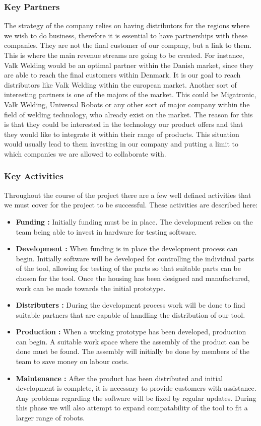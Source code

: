 \subsubsection{Key Partners}
The strategy of the company relies on having distributors for the regions where we wish to do business, therefore it is essential to have partnerships with these companies. They are not the final customer of our company, but a link to them. This is where the main revenue streams are going to be created.
For instance, Valk Welding would be an optimal partner within the Danish market, since they are able to reach the final customers within Denmark. It is our goal to reach distributors like Valk Welding within the european market.
Another sort of interesting partners is one of the majors of the market. This could be Migatronic, Valk Welding, Universal Robots or any other sort of major company within the field of welding technology, who already exist on the market. The reason for this is that they could be interested in the technology our product offers and that they would like to integrate it within their range of products. This situation would usually lead to them investing in our company and putting a limit to which companies we are allowed to collaborate with.

\subsubsection{Key Activities}
Throughout the course of the project there are a few well defined activities that we must cover for the project to be successful. These activities are described here:

\begin{itemize}
	\item \textbf{Funding		:} Initially funding must be in place. The development relies on the team being able to invest in hardware for testing software. 
	\item \textbf{Development	:} When funding is in place the development process can begin. Initially software will be developed for controlling the individual parts of the tool, allowing for testing of the parts so that suitable parts can be chosen for the tool. Once the housing has been designed and manufactured, work can be made towards the initial prototype.
	\item \textbf{Distributers	:} During the development process work will be done to find suitable partners that are capable of handling the distribution of our tool.
	\item \textbf{Production	:} When a working prototype has been developed, production can begin. A suitable work space where the assembly of the product can be done must be found. The assembly will initially be done by members of the team to save money on labour costs. 
	\item \textbf{Maintenance	:} After the product has been distributed and initial development is complete, it is necessary to provide customers with assistance. Any problems regarding the software will be fixed by regular updates. During this phase we will also attempt to expand compatability of the tool to fit a larger range of robots.
\end{itemize} 

